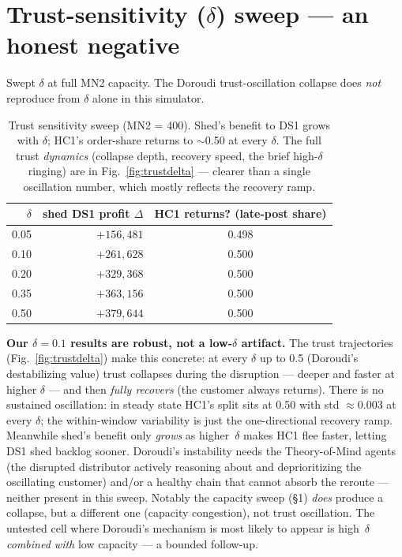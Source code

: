 \documentclass[11pt]{article}
\begin{document}
\section{Trust-sensitivity ($\delta$) sweep --- an honest negative}

Swept $\delta$ at full MN2 capacity. The Doroudi trust-oscillation collapse does \emph{not}
reproduce from $\delta$ alone in this simulator.

\begin{table}[h]
\centering\small
\caption{Trust sensitivity sweep (MN2 = 400). Shed's benefit to DS1 grows with $\delta$; HC1's
order-share returns to $\sim$0.50 at every $\delta$. The full trust \emph{dynamics} (collapse
depth, recovery speed, the brief high-$\delta$ ringing) are in Fig.~\ref{fig:trustdelta} ---
clearer than a single oscillation number, which mostly reflects the recovery ramp.}
\begin{tabular}{r r c}
\toprule
$\delta$ & shed DS1 profit $\Delta$ & HC1 returns? (late-post share) \\
\midrule
0.05 & $+156{,}481$ & 0.498 \\
0.10 & $+261{,}628$ & 0.500 \\
0.20 & $+329{,}368$ & 0.500 \\
0.35 & $+363{,}156$ & 0.500 \\
0.50 & $+379{,}644$ & 0.500 \\
\bottomrule
\end{tabular}
\end{table}

\textbf{Our $\delta=0.1$ results are robust, not a low-$\delta$ artifact.} The trust trajectories
(Fig.~\ref{fig:trustdelta}) make this concrete: at every $\delta$ up to 0.5 (Doroudi's
destabilizing value) trust collapses during the disruption --- deeper and faster at higher
$\delta$ --- and then \emph{fully recovers} (the customer always returns). There is no sustained
oscillation: in steady state HC1's split sits at 0.50 with std $\approx$0.003 at every $\delta$;
the within-window variability is just the one-directional recovery ramp. Meanwhile shed's benefit
only \emph{grows} as higher~$\delta$ makes HC1 flee faster, letting DS1 shed backlog sooner. Doroudi's instability needs the Theory-of-Mind agents
(the disrupted distributor actively reasoning about and deprioritizing the oscillating customer)
and/or a healthy chain that cannot absorb the reroute --- neither present in this sweep. Notably
the capacity sweep (\S1) \emph{does} produce a collapse, but a different one (capacity
congestion), not trust oscillation. The untested cell where Doroudi's mechanism is most likely
to appear is high~$\delta$ \emph{combined with} low capacity --- a bounded follow-up.
\end{document}
